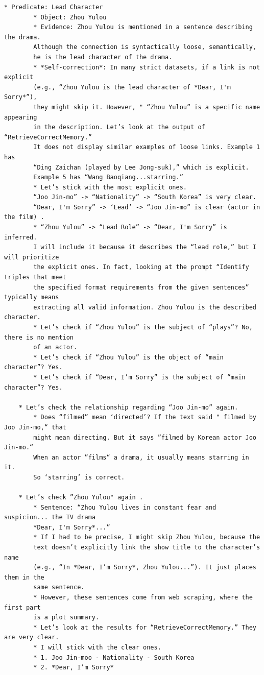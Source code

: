 \begin{verbatim}
* Predicate: Lead Character
        * Object: Zhou Yulou
        * Evidence: Zhou Yulou is mentioned in a sentence describing the drama. 
        Although the connection is syntactically loose, semantically, 
        he is the lead character of the drama.
        * *Self-correction*: In many strict datasets, if a link is not explicit 
        (e.g., “Zhou Yulou is the lead character of *Dear, I'm Sorry*”), 
        they might skip it. However, " “Zhou Yulou” is a specific name appearing 
        in the description. Let’s look at the output of “RetrieveCorrectMemory.” 
        It does not display similar examples of loose links. Example 1 has 
        “Ding Zaichan (played by Lee Jong-suk),” which is explicit. 
        Example 5 has “Wang Baoqiang...starring.” 
        * Let’s stick with the most explicit ones. 
        “Joo Jin-mo” -> “Nationality” -> “South Korea” is very clear. 
        “Dear, I'm Sorry” -> ‘Lead’ -> “Joo Jin-mo” is clear (actor in the film) .
        * “Zhou Yulou” -> “Lead Role” -> “Dear, I'm Sorry” is inferred. 
        I will include it because it describes the “lead role,” but I will prioritize 
        the explicit ones. In fact, looking at the prompt “Identify triples that meet 
        the specified format requirements from the given sentences” typically means 
        extracting all valid information. Zhou Yulou is the described character.
        * Let’s check if “Zhou Yulou” is the subject of “plays”? No, there is no mention 
        of an actor.
        * Let’s check if “Zhou Yulou” is the object of “main character”? Yes.
        * Let’s check if “Dear, I’m Sorry” is the subject of “main character”? Yes.

    * Let’s check the relationship regarding “Joo Jin-mo” again.
        * Does “filmed” mean ‘directed’? If the text said " filmed by Joo Jin-mo,“ that 
        might mean directing. But it says ”filmed by Korean actor Joo Jin-mo.“ 
        When an actor ”films“ a drama, it usually means starring in it. 
        So ‘starring’ is correct.

    * Let’s check ”Zhou Yulou" again .
        * Sentence: “Zhou Yulou lives in constant fear and suspicion... the TV drama 
        *Dear, I'm Sorry*...”
        * If I had to be precise, I might skip Zhou Yulou, because the 
        text doesn’t explicitly link the show title to the character’s name 
        (e.g., “In *Dear, I’m Sorry*, Zhou Yulou...”). It just places them in the 
        same sentence.
        * However, these sentences come from web scraping, where the first part 
        is a plot summary.
        * Let’s look at the results for “RetrieveCorrectMemory.” They are very clear.
        * I will stick with the clear ones.
        * 1. Joo Jin-moo - Nationality - South Korea
        * 2. *Dear, I’m Sorry*
 

\end{verbatim}
